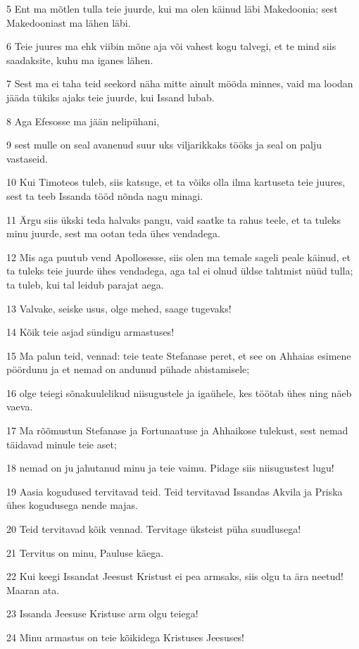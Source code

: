 \par 5 Ent ma mõtlen tulla teie juurde, kui ma olen käinud läbi Makedoonia; sest Makedooniast ma lähen läbi.
\par 6 Teie juures ma ehk viibin mõne aja või vahest kogu talvegi, et te mind siis saadaksite, kuhu ma iganes lähen.
\par 7 Sest ma ei taha teid seekord näha mitte ainult mööda minnes, vaid ma loodan jääda tükiks ajaks teie juurde, kui Issand lubab.
\par 8 Aga Efesosse ma jään nelipühani,
\par 9 sest mulle on seal avanenud suur uks viljarikkaks tööks ja seal on palju vastaseid.
\par 10 Kui Timoteos tuleb, siis katsuge, et ta võiks olla ilma kartuseta teie juures, sest ta teeb Issanda tööd nõnda nagu minagi.
\par 11 Ärgu siis ükski teda halvaks pangu, vaid saatke ta rahus teele, et ta tuleks minu juurde, sest ma ootan teda ühes vendadega.
\par 12 Mis aga puutub vend Apollosesse, siis olen ma temale sageli peale käinud, et ta tuleks teie juurde ühes vendadega, aga tal ei olnud üldse tahtmist nüüd tulla; ta tuleb, kui tal leidub parajat aega.
\par 13 Valvake, seiske usus, olge mehed, saage tugevaks!
\par 14 Kõik teie asjad sündigu armastuses!
\par 15 Ma palun teid, vennad: teie teate Stefanase peret, et see on Ahhaias esimene pöördunu ja et nemad on andunud pühade abistamisele;
\par 16 olge teiegi sõnakuulelikud niisugustele ja igaühele, kes töötab ühes ning näeb vaeva.
\par 17 Ma rõõmustun Stefanase ja Fortunaatuse ja Ahhaikose tulekust, sest nemad täidavad minule teie aset;
\par 18 nemad on ju jahutanud minu ja teie vaimu. Pidage siis niisugustest lugu!
\par 19 Aasia kogudused tervitavad teid. Teid tervitavad Issandas Akvila ja Priska ühes kogudusega nende majas.
\par 20 Teid tervitavad kõik vennad. Tervitage üksteist püha suudlusega!
\par 21 Tervitus on minu, Pauluse käega.
\par 22 Kui keegi Issandat Jeesust Kristust ei pea armsaks, siis olgu ta ära neetud! Maaran ata.
\par 23 Issanda Jeesuse Kristuse arm olgu teiega!
\par 24 Minu armastus on teie kõikidega Kristuses Jeesuses!





